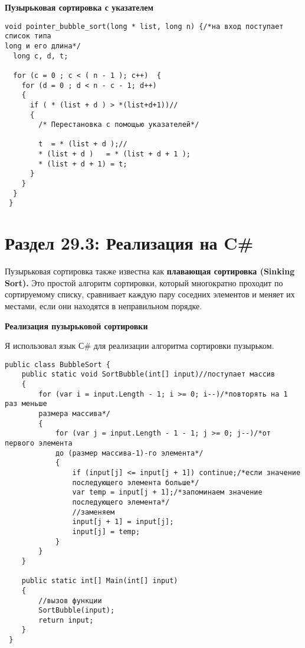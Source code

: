 \vspace{\baselineskip}

\textbf{Пузырьковая сортировка с указателем} 

\vspace{\baselineskip}

\begin{tcolorbox} 
\begin{verbatim}
void pointer_bubble_sort(long * list, long n) {/*на вход поступает список типа 
long и его длина*/
  long c, d, t;
 
  for (c = 0 ; c < ( n - 1 ); c++)  {
    for (d = 0 ; d < n - c - 1; d++)
    {
      if ( * (list + d ) > *(list+d+1))//
      {
        /* Перестановка с помощью указателей*/
 
        t  = * (list + d );//
        * (list + d )   = * (list + d + 1 );
        * (list + d + 1) = t;
      }
    }
  }
 }
\end{verbatim}
\end{tcolorbox}

\section*{Раздел 29.3: Реализация на C\#}

\vspace{\baselineskip}

Пузырьковая сортировка также известна как \textbf{плавающая сортировка (Sinking Sort).} Это простой алгоритм сортировки, который многократно проходит по сортируемому списку, сравнивает каждую пару соседних элементов и меняет их местами, если они находятся в неправильном порядке.

\vspace{\baselineskip}

 \textbf{Реализация пузырьковой сортировки}
 
 
 
 Я использовал язык С\# для реализации алгоритма сортировки пузырьком.
 
 \vspace{\baselineskip}
 
\begin{tcolorbox} 
\begin{verbatim}
public class BubbleSort {
    public static void SortBubble(int[] input)//поступает массив
    {
        for (var i = input.Length - 1; i >= 0; i--)/*повторять на 1 раз меньше 
        размера массива*/
        {
            for (var j = input.Length - 1 - 1; j >= 0; j--)/*от первого элемента
            до (размер массива-1)-го элемента*/
            {
                if (input[j] <= input[j + 1]) continue;/*если значение 
                последующего элемента больше*/
                var temp = input[j + 1];/*запоминаем значение 
                последующего элемента*/
                //заменяем
                input[j + 1] = input[j];
                input[j] = temp;
            }
        }
    }

    public static int[] Main(int[] input)
    {
        //вызов функции
        SortBubble(input);
        return input;
    }
 }
\end{verbatim}
\end{tcolorbox}

